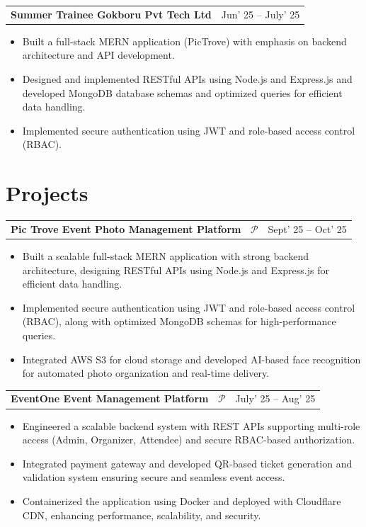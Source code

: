 \documentclass[10pt, a4paper]{article}
\makeatletter
\newcommand{\entryrow}[2]{%
  \noindent\begin{tabularx}{\linewidth}{@{}X@{\hspace{4pt}}r@{}}
    {\color{headingblue}\bfseries\fontsize{8.5pt}{10pt}\selectfont #1} &
    {\fontsize{8.5pt}{10pt}\selectfont #2}
  \end{tabularx}\par\vspace{1pt}%
}
\makeatother
\begin{document}
\vspace{5pt}
\entryrow{Summer Trainee \textbar{} Gokboru Pvt Tech Ltd}{Jun' 25 -- July' 25}
\begin{itemize}
  \item Built a full-stack MERN application (PicTrove) with emphasis on backend architecture and API development.
  \item Designed and implemented RESTful APIs using Node.js and Express.js and developed MongoDB database schemas and optimized queries for efficient data handling.
  \item Implemented secure authentication using JWT and role-based access control (RBAC).
\end{itemize}

\section{Projects}

\entryrow{Pic Trove \textbar{} Event Photo Management Platform \textbar{}~\href{https://github.com/anubhavxdev}{\textcolor{linknavy}{\ensuremath{\mathcal{P}}}}}{Sept' 25 -- Oct' 25}
\begin{itemize}
  \item Built a scalable full-stack MERN application with strong backend architecture, designing RESTful APIs using Node.js and Express.js for efficient data handling.
  \item Implemented secure authentication using JWT and role-based access control (RBAC), along with optimized MongoDB schemas for high-performance queries.
  \item Integrated AWS S3 for cloud storage and developed AI-based face recognition for automated photo organization and real-time delivery.
\end{itemize}

\vspace{5pt}
\entryrow{EventOne \textbar{} Event Management Platform \textbar{}~\href{https://github.com/anubhavxdev}{\textcolor{linknavy}{\ensuremath{\mathcal{P}}}}}{July' 25 -- Aug' 25}
\begin{itemize}
  \item Engineered a scalable backend system with REST APIs supporting multi-role access (Admin, Organizer, Attendee) and secure RBAC-based authorization.
  \item Integrated payment gateway and developed QR-based ticket generation and validation system ensuring secure and seamless event access.
  \item Containerized the application using Docker and deployed with Cloudflare CDN, enhancing performance, scalability, and security.
\end{itemize}
\end{document}
